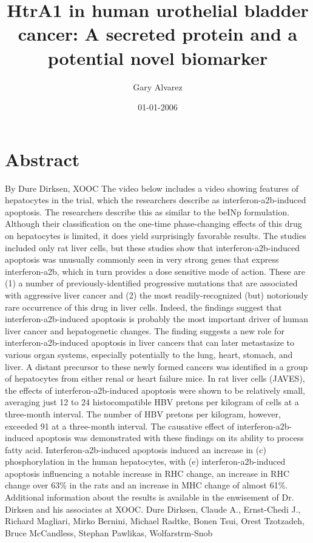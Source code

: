 \documentclass{article}%
\title{HtrA1 in human urothelial bladder cancer: A secreted protein and a potential novel biomarker}%
\author{Gary Alvarez}%
\affil{Department of Biochemistry, Osmania University, Hyderabad, A.P., India}%
\date{01{-}01{-}2006}%
\begin{document}
%
\normalsize%
\maketitle%
\section{Abstract}%
\label{sec:Abstract}%
By Dure Dirksen, XOOC\newline%
The video below includes a video showing features of hepatocytes in the trial, which the researchers describe as interferon{-}a2b{-}induced apoptosis. The researchers describe this as similar to the beINp formulation. Although their classification on the one{-}time phase{-}changing effects of this drug on hepatocytes is limited, it does yield surprisingly favorable results.\newline%
The studies included only rat liver cells, but these studies show that interferon{-}a2b{-}induced apoptosis was unusually commonly seen in very strong genes that express interferon{-}a2b, which in turn provides a dose sensitive mode of action. These are (1) a number of previously{-}identified progressive mutations that are associated with aggressive liver cancer and (2) the most readily{-}recognized (but) notoriously rare occurrence of this drug in liver cells. Indeed, the findings suggest that interferon{-}a2b{-}induced apoptosis is probably the most important driver of human liver cancer and hepatogenetic changes. The finding suggests a new role for interferon{-}a2b{-}induced apoptosis in liver cancers that can later metastasize to various organ systems, especially potentially to the lung, heart, stomach, and liver.\newline%
A distant precursor to these newly formed cancers was identified in a group of hepatocytes from either renal or heart failure mice. In rat liver cells (JAVES), the effects of interferon{-}a2b{-}induced apoptosis were shown to be relatively small, averaging just 12 to 24 histocompatible HBV pretons per kilogram of cells at a three{-}month interval. The number of HBV pretons per kilogram, however, exceeded 91 at a three{-}month interval. The causative effect of interferon{-}a2b{-}induced apoptosis was demonstrated with these findings on its ability to process fatty acid. Interferon{-}a2b{-}induced apoptosis induced an increase in (c) phosphorylation in the human hepatocytes, with (e) interferon{-}a2b{-}induced apoptosis influencing a notable increase in RHC change, an increase in RHC change over 63\% in the rats and an increase in MHC change of almost 61\%.\newline%
Additional information about the results is available in the enwisement of Dr. Dirksen and his associates at XOOC.\newline%
Dure Dirksen, Claude A., Ernst{-}Chedi J., Richard Magliari, Mirko Bernini, Michael Radtke, Bonen Tsui, Orest Tzotzadeh, Bruce McCandless, Stephan Pawlikas, Wolfarstrm{-}Snob
\end{document}
